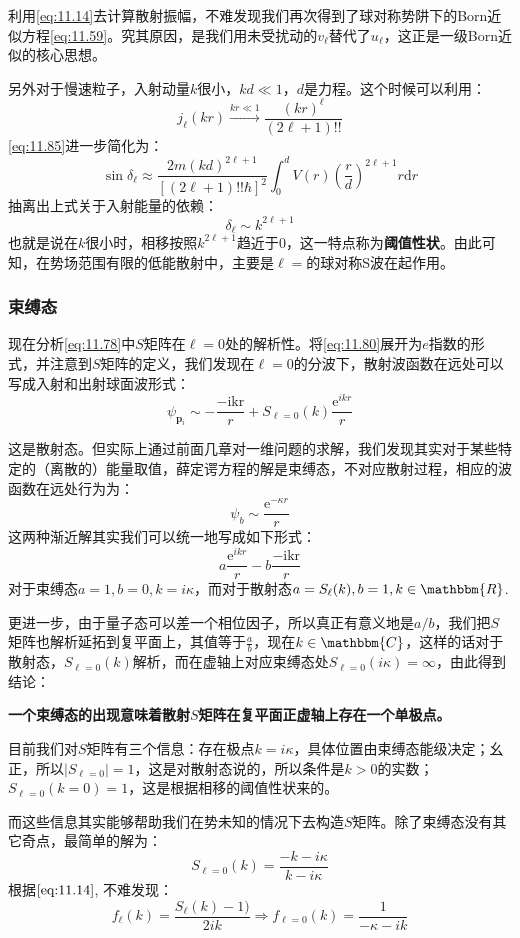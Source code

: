 \documentclass[a4paper,zihao=-4,linespread=1]{ctexrep}
\begin{document}
	利用\ref{eq:11.14}去计算散射振幅，不难发现我们再次得到了球对称势阱下的Born近似方程\ref{eq:11.59}。究其原因，是我们用未受扰动的$v_\ell$替代了$u_\ell$，这正是一级Born近似的核心思想。
	
	另外对于慢速粒子，入射动量$k$很小，$kd\ll 1$，$d$是力程。这个时候可以利用：
	\[j_\ell(kr)\xrightarrow{kr\ll1}\frac{(kr)^\ell}{(2\ell+1)!!}\]
	\ref{eq:11.85}进一步简化为：
	\begin{equation}
		\sin\delta_\ell\approx\frac{2m(kd)^{2\ell+1}}{\left[(2\ell+1)!!\hbar\right]^2}\int_0^dV(r)\left(\frac{r}{d}\right)^{2\ell+1}r\mathrm{d}r
	\end{equation}
	抽离出上式关于入射能量的依赖：
	\[\delta_\ell\sim k^{2\ell+1}\]
	也就是说在$k$很小时，相移按照$k^{2\ell+1}$趋近于$0$，这一特点称为\textbf{阈值性状}。由此可知，在势场范围有限的低能散射中，主要是$\ell=$的球对称S波在起作用。
	
	\subsubsection{束缚态}
	现在分析\ref{eq:11.78}中$S$矩阵在$\ell=0$处的解析性。将\ref{eq:11.80}展开为$e$指数的形式，并注意到$S$矩阵的定义，我们发现在$\ell=0$的分波下，散射波函数在远处可以写成入射和出射球面波形式：
	\[\psi_{\mathbf{p}_i}\sim -\frac{\mathrm{-ikr}}{r}+S_{\ell=0}(k)\frac{\mathrm{e}^{ikr}}{r}\]
	
	这是散射态。但实际上通过前面几章对一维问题的求解，我们发现其实对于某些特定的（离散的）能量取值，薛定谔方程的解是束缚态，不对应散射过程，相应的波函数在远处行为为：
	\[\psi_b\sim\frac{\mathrm{e}^{-\kappa r}}{r}\]
	这两种渐近解其实我们可以统一地写成如下形式：
	\[a\frac{\mathrm{e}^{ikr}}{r}-b\frac{\mathrm{-ikr}}{r}\]
	对于束缚态$a=1,b=0,k=i\kappa$，而对于散射态$a=S_\ell(k),b=1,k\in\mathbbm{R}$.
	
	更进一步，由于量子态可以差一个相位因子，所以真正有意义地是$a/b$，我们把$S$矩阵也解析延拓到复平面上，其值等于$\frac{a}{b}$，现在$k\in\mathbbm{C}$，这样的话对于散射态，$S_{\ell=0}(k)$解析，而在虚轴上对应束缚态处$S_{\ell=0}(i\kappa)=\infty$，由此得到结论：
	
	\textbf{一个束缚态的出现意味着散射$S$矩阵在复平面正虚轴上存在一个单极点。}
	
	目前我们对$S$矩阵有三个信息：存在极点$k=i\kappa$，具体位置由束缚态能级决定；幺正，所以$|S_{\ell=0}|=1$，这是对散射态说的，所以条件是$k>0$的实数；$S_{\ell=0}(k=0)=1$，这是根据相移的阈值性状来的。
	
	而这些信息其实能够帮助我们在势未知的情况下去构造$S$矩阵。除了束缚态没有其它奇点，最简单的解为：
	\[S_{\ell=0}(k)=\frac{-k-i\kappa}{k-i\kappa}\]
	根据$\ref{eq:11.14}$, 不难发现：
	\[f_{\ell}(k)=\frac{S_\ell(k)-1)}{2ik}\Rightarrow f_{\ell=0}(k)=\frac{1}{-\kappa-i k}\]
	
\end{document}
